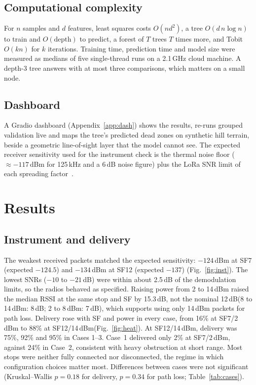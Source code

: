\documentclass[conference]{IEEEtran}
\newcommand{\dBm}{\,dBm\xspace}
\newcommand{\dB}{\,dB\xspace}
\begin{document}
\subsection{Computational complexity}
For $n$ samples and $d$ features, least squares costs $O(nd^2)$, a tree $O(d\,n\log n)$ to train and $O(\text{depth})$ to predict, a forest of $T$ trees $T$ times more, and Tobit $O(kn)$ for $k$ iterations. Training time, prediction time and model size were measured as medians of five single-thread runs on a 2.1\,GHz cloud machine. A depth-3 tree answers with at most three comparisons, which matters on a small node.

\subsection{Dashboard}
A Gradio dashboard (Appendix~\ref{app:dash}) shows the results, re-runs grouped validation live and maps the tree's predicted dead zones on synthetic hill terrain, beside a geometric line-of-sight layer that the model cannot see. The expected receiver sensitivity used for the instrument check is the thermal noise floor ($\approx -117$\dBm for 125\,kHz and a 6\dB noise figure) plus the LoRa SNR limit of each spreading factor~\cite{semtech_an1200}.

\section{Results}\label{sec:results}

\subsection{Instrument and delivery}
The weakest received packets matched the expected sensitivity: $-124$\dBm at SF7 (expected $-124.5$) and $-134$\dBm at SF12 (expected $-137$) (Fig.~\ref{fig:inst}). The lowest SNRs ($-10$ to $-21$\dB) were within about 2.5\dB of the demodulation limits, so the radios behaved as specified. Raising power from 2 to 14\dBm raised the median RSSI at the same stop and SF by 15.3\dB, not the nominal 12\dB (8 to 14\dBm: 8\dB; 2 to 8\dBm: 7\dB), which supports using only 14\dBm packets for path loss. Delivery rose with SF and power in every case, from 16\% at SF7/2\dBm to 88\% at SF12/14\dBm (Fig.~\ref{fig:heat}). At SF12/14\dBm, delivery was 75\%, 92\% and 95\% in Cases 1--3. Case~1 delivered only 2\% at SF7/2\dBm, against 24\% in Case~2, consistent with heavy obstruction at short range. Most stops were neither fully connected nor disconnected, the regime in which configuration choices matter most. Differences between cases were not significant (Kruskal--Wallis $p = 0.18$ for delivery, $p = 0.34$ for path loss; Table~\ref{tab:cases}).
\end{document}
